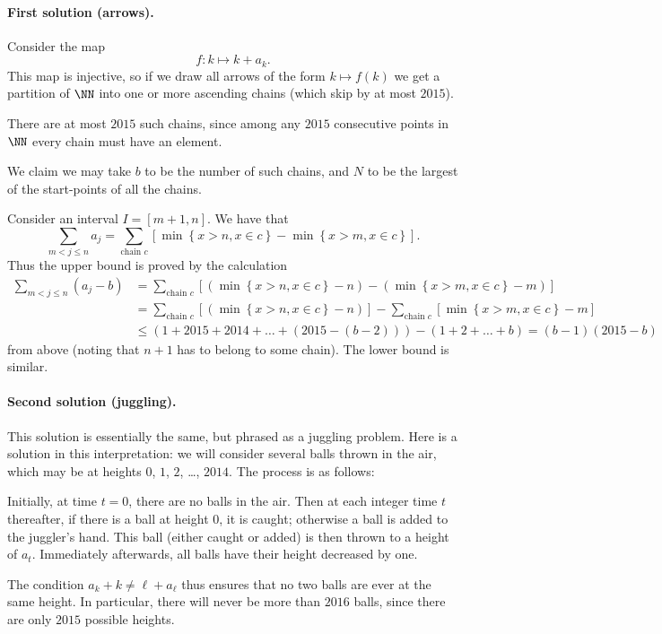 \documentclass[11pt]{scrartcl}
\begin{document}
\paragraph{First solution (arrows).}
Consider the map
\[ f \colon k \mapsto k + a_k. \]
This map is injective, so if we draw all arrows of the form $k \mapsto f(k)$
we get a partition of $\NN$ into one or more ascending chains
(which skip by at most $2015$).

There are at most $2015$ such chains,
since among any $2015$ consecutive points in $\NN$
every chain must have an element.

We claim we may take $b$ to be the number of such chains,
and $N$ to be the largest of the start-points of all the chains.

Consider an interval $I = [m+1, n]$.
We have that
\[ \sum_{m<j\le n} a_j = \sum_{\text{chain } c} \left[ \min \left\{ x > n, x \in c \right\}
  - \min \left\{ x > m, x \in c \right\} \right]. \]
Thus the upper bound is proved by the calculation
\begin{align*}
  \sum_{m<j\le n} (a_j-b)
  &= \sum_{\text{chain } c} \left[ (\min \left\{ x > n, x \in c \right\} - n)
    - (\min \left\{ x > m, x \in c \right\} - m) \right] \\
  &= \sum_{\text{chain } c} \left[ (\min \left\{ x > n, x \in c \right\} - n) \right]
    - \sum_{\text{chain } c} \left[
    \min \left\{ x > m, x \in c \right\} - m \right] \\
  &\le (1+2015+2014+\dots+(2015-(b-2)))-(1+2+\dots+b) = (b-1)(2015-b)
\end{align*}
from above (noting that $n+1$ has to belong to some chain).
The lower bound is similar.

\paragraph{Second solution (juggling).}
This solution is essentially the same, but phrased as a juggling problem.
Here is a solution in this interpretation:
we will consider several balls thrown in the air,
which may be at heights $0$, $1$, $2$, \dots, $2014$.
The process is as follows:
\begin{itemize}
\ii Initially, at time $t = 0$, there are no balls in the air.
\ii Then at each integer time $t$ thereafter,
if there is a ball at height $0$, it is caught;
otherwise a ball is added to the juggler's hand.
This ball (either caught or added) is then thrown to a height of $a_t$.
\ii Immediately afterwards, all balls have their height decreased by one.
\end{itemize}
The condition $a_k + k \neq \ell + a_\ell$ thus ensures that
no two balls are ever at the same height.
In particular, there will never be more than $2016$ balls,
since there are only $2015$ possible heights.
\end{document}
